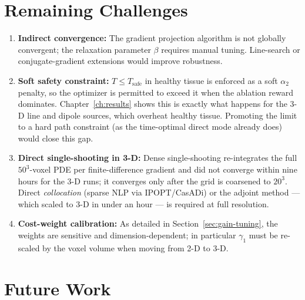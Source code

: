 \section{Remaining Challenges}

\begin{enumerate}
    \item \textbf{Indirect convergence:}
        The gradient projection algorithm is not globally convergent;
        the relaxation parameter $\beta$ requires manual tuning.
        Line-search or conjugate-gradient extensions would improve robustness.

    \item \textbf{Soft safety constraint:}
        $T \leq T_{\text{safe}}$ in healthy tissue is enforced as a soft
        $\alpha_2$ penalty, so the optimizer is permitted to exceed it
        when the ablation reward dominates. Chapter~\ref{ch:results} shows
        this is exactly what happens for the 3-D line and dipole sources,
        which overheat healthy tissue. Promoting the limit to a hard path
        constraint (as the time-optimal direct mode already does) would
        close this gap.

    \item \textbf{Direct single-shooting in 3-D:}
        Dense single-shooting re-integrates the full $50^3$-voxel PDE per
        finite-difference gradient and did not converge within nine hours
        for the 3-D runs; it converges only after the grid is coarsened to
        $20^3$. Direct \emph{collocation} (sparse NLP via IPOPT/CasADi) or
        the adjoint method --- which scaled to 3-D in under an hour --- is
        required at full resolution.

    \item \textbf{Cost-weight calibration:}
        As detailed in Section~\ref{sec:gain-tuning}, the weights are
        sensitive and dimension-dependent; in particular $\gamma_1$ must be
        re-scaled by the voxel volume when moving from 2-D to 3-D.
\end{enumerate}

\section{Future Work}

